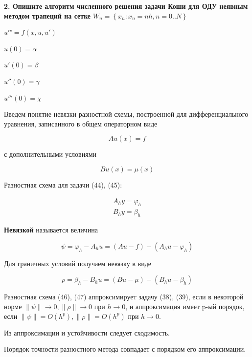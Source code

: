 \documentclass[a4paper,14pt]{article}
\begin{document}
\textbf{2. Опишите алгоритм численного решения задачи Коши для ОДУ неявным методом трапеций на сетке} 
$W_n = \left\{ x_n : x_n = nh, n = 0..N \right\}$

$u^{iv} = f(x, u, u')$

$u(0) = \alpha$

$u'(0) = \beta$

$u''(0) = \gamma$

$u'''(0) = \chi$

Введем понятие невязки разностной схемы, построенной для дифференциального
уравнения, записанного в общем операторном виде

\begin{equation}
	Au(x) = f
\end{equation}

с дополнительными условиями

\begin{equation}
	Bu(x) = \mu(x)
\end{equation}

Разностная схема для задачи (44), (45):

\begin{eqnarray}
	A_h y = \varphi_h \\
	B_h y = \beta_h
\end{eqnarray}

\textbf{Невязкой} называется величина

\begin{equation}
	\psi = \varphi_h - A_h u = (Au - f) - (A_h u -\varphi_h)
\end{equation}

Для граничных условий получаем невязку в виде

\begin{equation}
	\rho = \beta_h - B_h u = (Bu - \mu) - (B_h u - \beta_h)
\end{equation}

Разностная схема (46), (47) аппроксимирует 
задачу (38), (39), если в некоторой норме $\| \psi \| \rightarrow 0, \| \rho \| \rightarrow 0$ 
при $h \rightarrow0$, и аппроксимация имеет p-ый порядок, если
$\| \psi \| = O(h^p),  \| \rho \| = O(h^p)$ при $h \rightarrow0$.

Из аппроксимации и устойчивости
следует сходимость.

Порядок точности разностного метода совпадает с порядком его аппроксимации.
\end{document}
